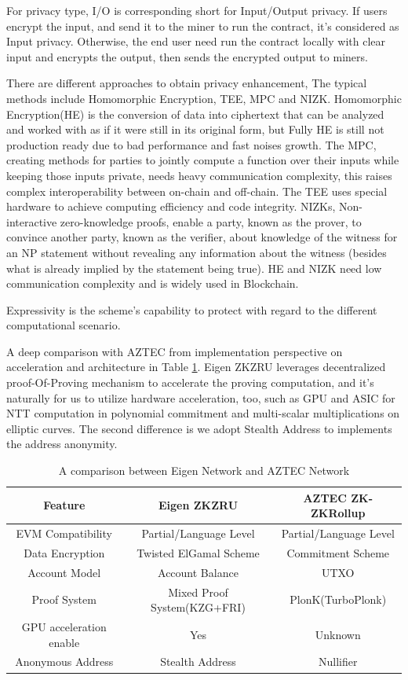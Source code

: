 \documentclass{article}
\begin{document}
For privacy type, I/O is corresponding short for Input/Output privacy. If users encrypt the input, and send it to the miner to run the contract, it's considered as Input privacy. Otherwise, the end user need run the contract locally with clear input and encrypts the output, then sends the encrypted output to miners.

There are different approaches to obtain privacy enhancement, The typical methods include Homomorphic Encryption, TEE, MPC and NIZK. Homomorphic Encryption(HE) is the conversion of data into ciphertext that can be analyzed and worked with as if it were still in its original form, but Fully HE is still not production ready due to bad performance and fast noises growth. The MPC, creating methods for parties to jointly compute a function over their inputs while keeping those inputs private, needs heavy communication complexity, this raises complex interoperability between on-chain and off-chain. The TEE uses special hardware to achieve computing efficiency and code integrity. NIZKs, Non-interactive zero-knowledge proofs, enable a party, known as the prover, to convince another party, known as the verifier, about knowledge of the witness for an NP statement without revealing any information about the witness (besides what is already implied by the statement being true). HE and NIZK need low communication complexity and is widely used in Blockchain. 

Expressivity is the scheme's capability to protect with regard to the different computational scenario.

A deep comparison with AZTEC from implementation perspective on acceleration and architecture in Table \ref{tab:widgets2}. Eigen ZKZRU leverages decentralized proof-Of-Proving mechanism to accelerate the proving computation, and it's naturally for us to utilize hardware acceleration, too, such as GPU and ASIC for NTT computation in polynomial commitment and multi-scalar multiplications on elliptic curves. The second difference is we adopt Stealth Address to implements the address anonymity.

\begin{table}
\centering
\begin{tabular}{c|c|c}
Feature & Eigen ZKZRU & AZTEC ZK-ZKRollup \\\hline
EVM Compatibility & Partial/Language Level & Partial/Language Level \\

Data Encryption & Twisted ElGamal Scheme & Commitment Scheme\\
Account Model & Account Balance & UTXO \\
Proof System & Mixed Proof System(KZG+FRI) & PlonK(TurboPlonk) \\
GPU acceleration enable & Yes & Unknown \\
Anonymous Address & Stealth Address & Nullifier \\

\end{tabular}
\caption{\label{tab:widgets2} A comparison between Eigen Network and AZTEC Network}
\end{table}
\end{document}
